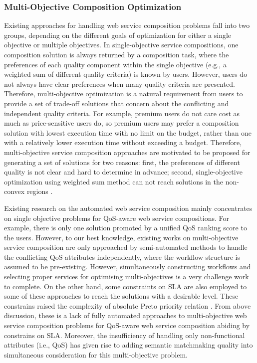 \subsubsection{Multi-Objective Composition Optimization}
Existing approaches for handling web service composition problems fall into two groups, depending on the different goals of optimization for either a single objective or multiple objectives. In single-objective service compositions, one composition solution is always returned by a composition task, where the preferences of each quality component within the single objective (e.g., a weighted sum of different quality criteria) is known by users. However, users do not always have clear preferences when many quality criteria are presented. Therefore, multi-objective optimization is a natural requirement from users to provide a set of trade-off solutions that concern about the conflicting and independent quality criteria. For example, premium users do not care cost as much as price-sensitive users do, so premium users may prefer a composition solution with lowest execution time with no limit on the budget,  rather than one with a relatively lower execution time without exceeding a budget. Therefore, multi-objective service composition approaches are motivated to be proposed for generating a set of solutions for two reasons: first, the preferences of different quality is not clear and hard to determine in advance; second, single-objective optimization using weighted sum method can not reach solutions in the non-convex regions \cite{kim2006adaptive}.  

Existing research on the automated web service composition mainly concentrates on single objective problems for QoS-aware web service compositions. For example, there is only one solution promoted by a unified QoS ranking score to the users. However, to our best knowledge, existing works on multi-objective service composition \cite{liu2005dynamic,wada2012e3,yao2009qos,yin2014hybrid} are only approached by semi-automated methods to handle the conflicting QoS attributes independently, where the workflow structure is assumed to be pre-existing. However, simultaneously constructing workflows and selecting proper services for optimising multi-objectives is a very challenge work to complete. On the other hand, some constraints on SLA are also employed to some of these approaches to reach the solutions with a desirable level. These constrains raised the complexity of absolute Preto priority relation \cite{garey1979guide}. From above discussion, these is a lack of fully automated approaches to multi-objective web service composition problems for QoS-aware web service composition abiding by constrains on SLA. Moreover, the insufficiency of handling only non-functional attributes (i.e., QoS) has given rise to adding semantic matchmaking quality into simultaneous consideration for this multi-objective problem.

